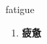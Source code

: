 
\begin{frame}
{\huge fatigue}
\begin{center}
\begin{enumerate}\Large
  \item \textbf{疲惫}
\end{enumerate}
\end{center}
\end{frame}
